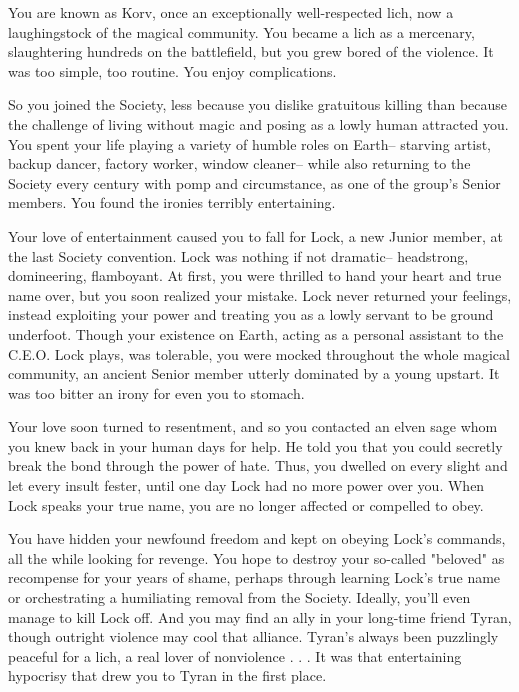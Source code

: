 \documentclass[char]{Sel}
\begin{document}
\name{\cKorv{}}
You are known as Korv, once an exceptionally well-respected lich, now a laughingstock of the magical community. You became a lich as a mercenary, slaughtering hundreds on the battlefield, but you grew bored of the violence. It was too simple, too routine. You enjoy complications.

So you joined the Society, less because you dislike gratuitous killing than because the challenge of living without magic and posing as a lowly human attracted you. You spent your life playing a variety of humble roles on Earth-- starving artist, backup dancer, factory worker, window cleaner-- while also returning to the Society every century with pomp and circumstance, as one of the group's Senior members. You found the ironies terribly entertaining.

Your love of entertainment caused you to fall for Lock, a new Junior member, at the last Society convention. Lock was nothing if not dramatic-- headstrong, domineering, flamboyant. At first, you were thrilled to hand your heart and true name over, but you soon realized your mistake. Lock never returned your feelings, instead exploiting your power and treating you as a lowly servant to be ground underfoot. Though your existence on Earth, acting as a personal assistant to the C.E.O. Lock plays, was tolerable, you were mocked throughout the whole magical community, an ancient Senior member utterly dominated by a young upstart. It was too bitter an irony for even you to stomach.

Your love soon turned to resentment, and so you contacted an elven sage whom you knew back in your human days for help. He told you that you could secretly break the bond through the power of hate. Thus, you dwelled on every slight and let every insult fester, until one day Lock had no more power over you. When Lock speaks your true name, you are no longer affected or compelled to obey.

You have hidden your newfound freedom and kept on obeying Lock's commands, all the while looking for revenge. You hope to destroy your so-called "beloved" as recompense for your years of shame, perhaps through learning Lock's true name or orchestrating a humiliating removal from the Society. Ideally, you'll even manage to kill Lock off. And you may find an ally in your long-time friend Tyran, though outright violence may cool that alliance. Tyran's always been puzzlingly peaceful for a lich, a real lover of nonviolence . . . It was that entertaining hypocrisy that drew you to Tyran in the first place.
\end{document}
